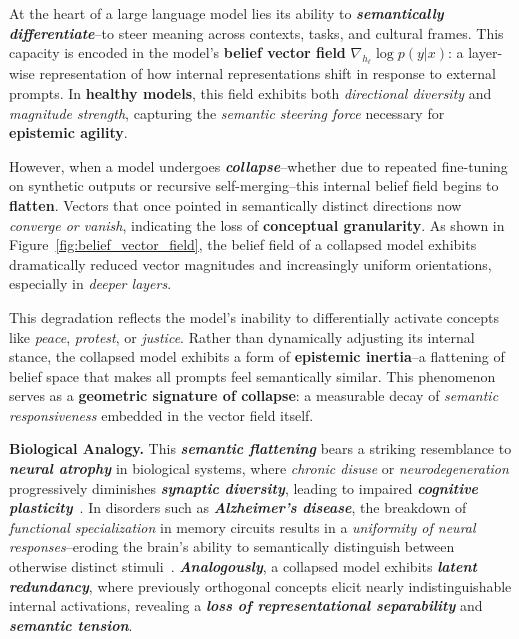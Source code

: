 \vspace{0.5em}
\noindent At the heart of a large language model lies its ability to \textbf{\emph{semantically differentiate}}--to steer meaning across contexts, tasks, and cultural frames. This capacity is encoded in the model’s \textbf{belief vector field} $\nabla_{h_\ell} \log p(y|x)$: a layer-wise representation of how internal representations shift in response to external prompts. In \textbf{healthy models}, this field exhibits both \emph{directional diversity} and \emph{magnitude strength}, capturing the \textit{semantic steering force} necessary for \textbf{epistemic agility}.

\vspace{0.5em}
\noindent However, when a model undergoes \textbf{\emph{collapse}}--whether due to repeated fine-tuning on synthetic outputs or recursive self-merging--this internal belief field begins to \textbf{flatten}. Vectors that once pointed in semantically distinct directions now \emph{converge or vanish}, indicating the loss of \textbf{conceptual granularity}. As shown in Figure~\ref{fig:belief_vector_field}, the belief field of a collapsed model exhibits dramatically reduced vector magnitudes and increasingly uniform orientations, especially in \textit{deeper layers}.

\vspace{0.5em}
\noindent This degradation reflects the model's inability to differentially activate concepts like \textit{peace}, \textit{protest}, or \textit{justice}. Rather than dynamically adjusting its internal stance, the collapsed model exhibits a form of \textbf{epistemic inertia}--a flattening of belief space that makes all prompts feel semantically similar. This phenomenon serves as a \textbf{geometric signature of collapse}: a measurable decay of \emph{semantic responsiveness} embedded in the vector field itself.

\vspace{0.5em}
\noindent \textbf{Biological Analogy.} This \textbf{\emph{semantic flattening}} bears a striking resemblance to \textbf{\emph{neural atrophy}} in biological systems, where \emph{chronic disuse} or \emph{neurodegeneration} progressively diminishes \textbf{\emph{synaptic diversity}}, leading to impaired \textbf{\emph{cognitive plasticity}}~\citep{morrison1997synaptic, sperling2011toward}. In disorders such as \textbf{\emph{Alzheimer’s disease}}, the breakdown of \emph{functional specialization} in memory circuits results in a \emph{uniformity of neural responses}--eroding the brain’s ability to semantically distinguish between otherwise distinct stimuli~\citep{buckner2004functional}. \textbf{\emph{Analogously}}, a collapsed model exhibits \textbf{\emph{latent redundancy}}, where previously orthogonal concepts elicit nearly indistinguishable internal activations, revealing a \textbf{\emph{loss of representational separability}} and \textbf{\emph{semantic tension}}.

